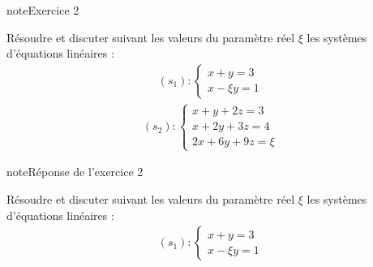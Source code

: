 \documentclass[letterpaper,10pt,french]{jupyterBook}
\begin{document}
\begin{sphinxadmonition}{note}{Exercice 2}

\sphinxAtStartPar
Résoudre et discuter suivant les valeurs du paramètre réel \(\xi\) les systèmes
d’équations linéaires :
\begin{equation*}
\begin{split}
(s_1) : \left\{
\begin{array}{l}
x + y = 3 \\
x - \xi y  = 1
\end{array}
\right.
\end{split}
\end{equation*}\begin{equation*}
\begin{split}
(s_2) : \left\{
\begin{array}{l}
x + y + 2z = 3 \\
x + 2y + 3z = 4 \\
2x + 6y + 9z = \xi
\end{array}
\right.
\end{split}
\end{equation*}\end{sphinxadmonition}

\begin{sphinxadmonition}{note}{Réponse de l’exercice 2}

\sphinxAtStartPar
Résoudre et discuter suivant les valeurs du paramètre réel \(\xi\) les systèmes
d’équations linéaires :
\begin{equation*}
\begin{split}
(s_1) : \left\{
\begin{array}{l}
x + y = 3 \\
x - \xi y  = 1
\end{array}
\right.
\end{split}
\end{equation*}\end{sphinxadmonition}
\end{document}
